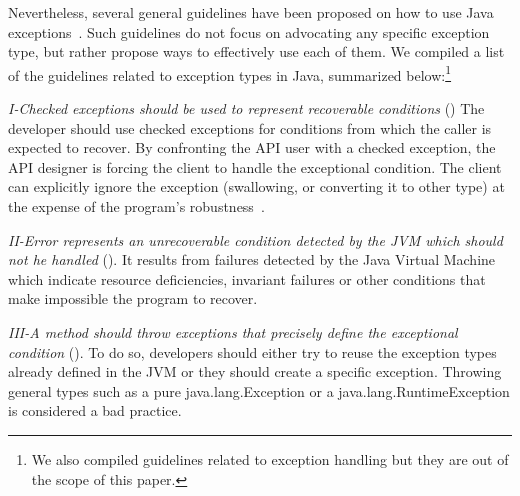 \documentclass[conference]{IEEEtran}
\begin{document}
Nevertheless, several general guidelines have been proposed on how to use Java
exceptions~\cite{mandrioli1992advances,gosling2000java,wirfs2006toward,
bloch2008effective}. Such guidelines do not focus on 
advocating any specific exception type, but rather propose ways to effectively use each of them.
 We compiled a list of the guidelines related to exception types in Java, 
summarized below:\footnote{We also compiled guidelines related
to exception handling but they are out of the scope of this paper.}


\emph{I-Checked exceptions should be used to represent recoverable
conditions} (\cite{mandrioli1992advances,gosling2000java,wirfs2006toward,bloch2008effective})
The developer should use checked exceptions for conditions from which the caller
is expected to recover. By confronting the API user with a checked exception,
the API designer is forcing the client to handle the exceptional condition. The
client can explicitly ignore the exception (swallowing, or converting it to
other type) at the expense of the program's robustness~\cite{gosling2000java}.

\emph{II-Error represents an unrecoverable condition detected by the JVM which
should not he handled} (\cite{gosling2000java}). It results from failures detected
by the Java Virtual Machine which indicate resource deficiencies, invariant
failures or other conditions that make impossible the program to recover.


\emph{III-A method should throw exceptions that precisely define the
exceptional condition} (\cite{gosling2000java,bloch2008effective}). To do so,
developers should either try to reuse the exception types already defined in the
JVM or they should create a specific exception. Throwing general types such as a
pure java.lang.Exception or a java.lang.RuntimeException is considered a bad practice.

\end{document}
